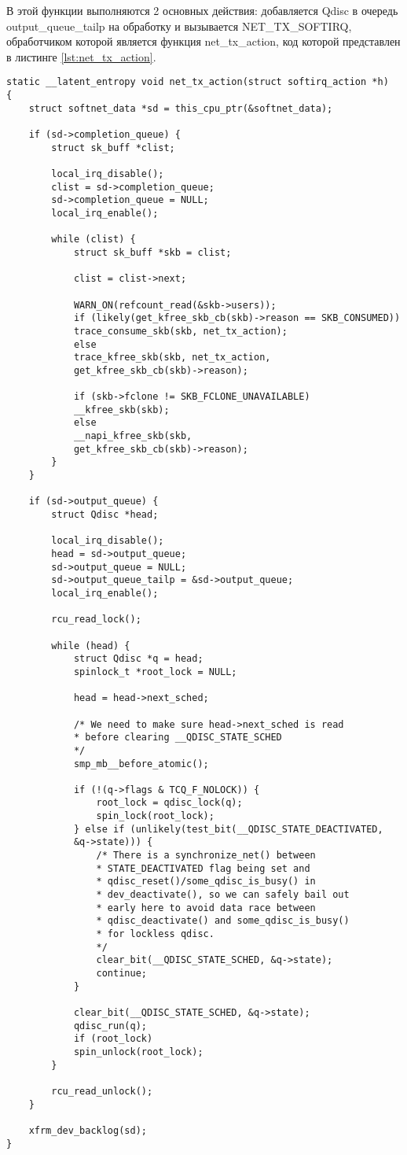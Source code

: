 В этой функции выполняются 2 основных действия: добавляется Qdisc в очередь output\_queue\_tailp на обработку и вызывается NET\_TX\_SOFTIRQ, обработчиком которой является функция net\_tx\_action, код которой представлен в листинге \ref{lst:net_tx_action}.
\begin{center}
	\captionsetup{justification=raggedright,singlelinecheck=off}
	\begin{lstlisting}[label=lst:net_tx_action,caption=Функция net\_tx\_action,showstringspaces=false]
static __latent_entropy void net_tx_action(struct softirq_action *h)
{
	struct softnet_data *sd = this_cpu_ptr(&softnet_data);
	
	if (sd->completion_queue) {
		struct sk_buff *clist;
		
		local_irq_disable();
		clist = sd->completion_queue;
		sd->completion_queue = NULL;
		local_irq_enable();
		
		while (clist) {
			struct sk_buff *skb = clist;
			
			clist = clist->next;
			
			WARN_ON(refcount_read(&skb->users));
			if (likely(get_kfree_skb_cb(skb)->reason == SKB_CONSUMED))
			trace_consume_skb(skb, net_tx_action);
			else
			trace_kfree_skb(skb, net_tx_action,
			get_kfree_skb_cb(skb)->reason);
			
			if (skb->fclone != SKB_FCLONE_UNAVAILABLE)
			__kfree_skb(skb);
			else
			__napi_kfree_skb(skb,
			get_kfree_skb_cb(skb)->reason);
		}
	}
	
	if (sd->output_queue) {
		struct Qdisc *head;
		
		local_irq_disable();
		head = sd->output_queue;
		sd->output_queue = NULL;
		sd->output_queue_tailp = &sd->output_queue;
		local_irq_enable();
		
		rcu_read_lock();
		
		while (head) {
			struct Qdisc *q = head;
			spinlock_t *root_lock = NULL;
			
			head = head->next_sched;
			
			/* We need to make sure head->next_sched is read
			* before clearing __QDISC_STATE_SCHED
			*/
			smp_mb__before_atomic();
			
			if (!(q->flags & TCQ_F_NOLOCK)) {
				root_lock = qdisc_lock(q);
				spin_lock(root_lock);
			} else if (unlikely(test_bit(__QDISC_STATE_DEACTIVATED,
			&q->state))) {
				/* There is a synchronize_net() between
				* STATE_DEACTIVATED flag being set and
				* qdisc_reset()/some_qdisc_is_busy() in
				* dev_deactivate(), so we can safely bail out
				* early here to avoid data race between
				* qdisc_deactivate() and some_qdisc_is_busy()
				* for lockless qdisc.
				*/
				clear_bit(__QDISC_STATE_SCHED, &q->state);
				continue;
			}
			
			clear_bit(__QDISC_STATE_SCHED, &q->state);
			qdisc_run(q);
			if (root_lock)
			spin_unlock(root_lock);
		}
		
		rcu_read_unlock();
	}
	
	xfrm_dev_backlog(sd);
}
	\end{lstlisting}
\end{center}
\FloatBarrier

